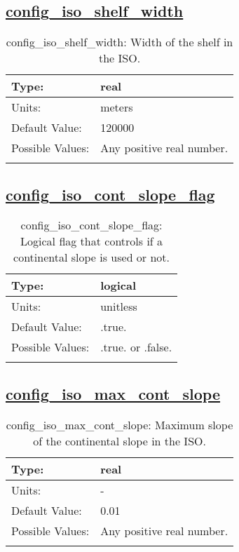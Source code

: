 \subsection[config\_iso\_shelf\_width]{\hyperref[sec:nm_tab_iso]{config\_iso\_shelf\_width}}
\label{subsec:nm_sec_config_iso_shelf_width}
\begin{center}
\begin{longtable}{| p{2.0in} || p{4.0in} |}
    \hline
    Type: & real \\
    \hline
    Units: & \si{meters} \\
    \hline
    Default Value: & 120000 \\
    \hline
    Possible Values: & Any positive real number. \\
    \hline
    \caption{config\_iso\_shelf\_width: Width of the shelf in the ISO.}
\end{longtable}
\end{center}
\subsection[config\_iso\_cont\_slope\_flag]{\hyperref[sec:nm_tab_iso]{config\_iso\_cont\_slope\_flag}}
\label{subsec:nm_sec_config_iso_cont_slope_flag}
\begin{center}
\begin{longtable}{| p{2.0in} || p{4.0in} |}
    \hline
    Type: & logical \\
    \hline
    Units: & \si{unitless} \\
    \hline
    Default Value: & .true. \\
    \hline
    Possible Values: & .true. or .false. \\
    \hline
    \caption{config\_iso\_cont\_slope\_flag: Logical flag that controls if a continental slope is used or not.}
\end{longtable}
\end{center}
\subsection[config\_iso\_max\_cont\_slope]{\hyperref[sec:nm_tab_iso]{config\_iso\_max\_cont\_slope}}
\label{subsec:nm_sec_config_iso_max_cont_slope}
\begin{center}
\begin{longtable}{| p{2.0in} || p{4.0in} |}
    \hline
    Type: & real \\
    \hline
    Units: & \si{-} \\
    \hline
    Default Value: & 0.01 \\
    \hline
    Possible Values: & Any positive real number. \\
    \hline
    \caption{config\_iso\_max\_cont\_slope: Maximum slope of the continental slope in the ISO.}
\end{longtable}
\end{center}
